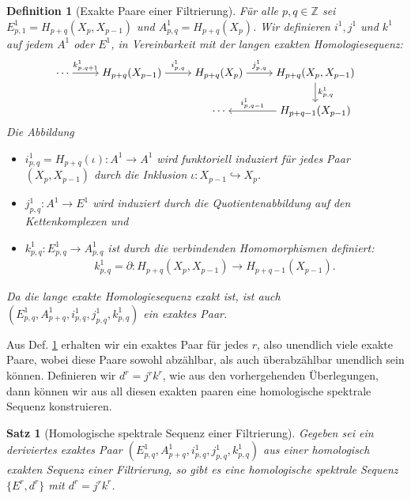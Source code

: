 \documentclass[12pt, hidelinks]{article}
\numberwithin{conj}{section}
\newtheorem{definition}[conj]{Definition}
\newtheorem{theorem}[conj]{Satz}
\newcommand{\Z}{\mathbb{Z}}
\begin{document}
\begin{definition}[Exakte Paare einer Filtrierung]
\label{exaktFiltration}
Für alle $p,q \in \Z$ sei $E^1_{p,1} = H_{p+q}(X_p,X_{p-1})$ und $A^1_{p,q} = H_{p+q}(X_p)$. Wir definieren $i^1,j^1$ und $k^1$ auf jedem $A^1$ oder $E^1$, in Vereinbarkeit mit der langen exakten Homologiesequenz:
\[\begin{tikzcd}[cramped]
	\cdots & {H_{p+q}(X_{p-1})} & {H_{p+q}(X_{p})} & {H_{p+q}(X_{p},X_{p-1})} \\
	& {} & \cdots & {H_{p+q-1}(X_{p-1})}
	\arrow["{k^1_{p,q+1}}", from=1-1, to=1-2]
	\arrow["{i^1_{p,q}}", from=1-2, to=1-3]
	\arrow["{j^1_{p,q}}", from=1-3, to=1-4]
	\arrow["{k^1_{p,q}}", from=1-4, to=2-4]
	\arrow["{i^1_{p,q-1}}"', from=2-4, to=2-3]
\end{tikzcd}\]
Die Abbildung
\begin{itemize}[nolistsep]
    \item $i^1_{p,q} = H_{p+q}(\iota): A^1 \to A^1$ wird funktoriell induziert für jedes Paar $(X_p,X_{p-1})$ durch die Inklusion $\iota: X_{p-1} \hookrightarrow X_p$.
    \item $j^1_{p,q}: A^1 \to E^1$ wird induziert durch die Quotientenabbildung auf den Kettenkomplexen und
    \item $k^1_{p,q}: E^1_{p,q} \to A^1_{p,q}$ ist durch die verbindenden Homomorphismen definiert:
    \begin{align}
        k^1_{p,q} = \partial: H_{p+q}(X_p,X_{p-1}) \to H_{p+q-1}(X_{p-1}).
    \end{align}
\end{itemize}
Da die lange exakte Homologiesequenz exakt ist, ist auch $(E^1_{p,q},A^1_{p+q},i^1_{p,q},j^1_{p,q},k^1_{p,q})$ ein exaktes Paar.
\end{definition}

Aus Def. \ref{exaktFiltration} erhalten wir ein exaktes Paar für jedes $r$, also unendlich viele exakte Paare, wobei diese Paare sowohl abzählbar, als auch überabzählbar unendlich sein können. Definieren wir $d^r = j^rk^r$, wie aus den vorhergehenden Überlegungen, dann können wir aus all diesen exakten paaren eine homologische spektrale Sequenz konstruieren.

\begin{theorem}[Homologische spektrale Sequenz einer Filtrierung]
Gegeben sei ein deriviertes exaktes Paar $(E^1_{p,q},A^1_{p+q},i^1_{p,q},j^1_{p,q},k^1_{p,q})$ aus einer homologisch exakten Sequenz einer Filtrierung, so gibt es eine homologische spektrale Sequenz $\{E^r,d^r\}$ mit $d^r = j^rk^r$.
\end{theorem}
\end{document}
